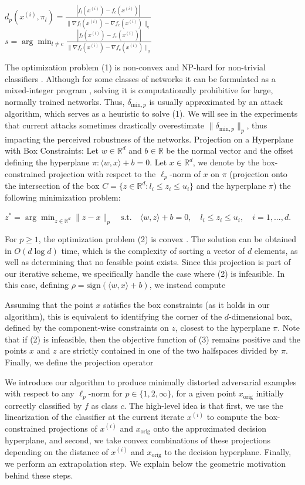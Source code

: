 $d_p(x^{(i)}, \pi_l) = \frac{|f_l(x^{(i)}) - f_c(x^{(i)})|}{\|\nabla f_l(x^{(i)}) - \nabla f_c(x^{(i)})\|_q}$
$s = \arg \min_{l \neq c} \frac{|f_l(x^{(i)}) - f_c(x^{(i)})|}{\|\nabla f_l(x^{(i)}) - \nabla f_c(x^{(i)})\|_q}$

The optimization problem (1) is non-convex and NP-hard for non-trivial classifiers \cite{katz2017reluplex}. Although for some classes of networks it can be formulated as a mixed-integer program \cite{tjeng2019evaluating}, solving it is computationally prohibitive for large, normally trained networks. Thus, $\delta_{\text{min},p}$ is usually approximated by an attack algorithm, which serves as a heuristic to solve (1). We will see in the experiments that current attacks sometimes drastically overestimate $\|\delta_{\text{min},p}\|_p$, thus impacting the perceived robustness of the networks.
Projection on a Hyperplane with Box Constraints: Let $w \in \mathbb{R}^d$ and $b \in \mathbb{R}$ be the normal vector and the offset defining the hyperplane $\pi : \langle w, x \rangle + b = 0$. Let $x \in \mathbb{R}^d$, we denote by the box-constrained projection with respect to the $\ell_p$-norm of $x$ on $\pi$ (projection onto the intersection of the box $C = \{ z \in \mathbb{R}^d : l_i \leq z_i \leq u_i \}$ and the hyperplane $\pi$) the following minimization problem:

$z^* = \arg \min_{z \in \mathbb{R}^d} \|z - x\|_p \quad \text{s.t.} \quad \langle w, z \rangle + b = 0, \quad l_i \leq z_i \leq u_i, \quad i = 1, ..., d.$

For $p \geq 1$, the optimization problem (2) is convex \cite{hein2017formal}. The solution can be obtained in $O(d \log d)$ time, which is the complexity of sorting a vector of $d$ elements, as well as determining that no feasible point exists. Since this projection is part of our iterative scheme, we specifically handle the case where (2) is infeasible. In this case, defining $\rho = \text{sign}(\langle w, x \rangle + b)$, we instead compute

Assuming that the point $x$ satisfies the box constraints (as it holds in our algorithm), this is equivalent to identifying the corner of the $d$-dimensional box, defined by the component-wise constraints on $z$, closest to the hyperplane $\pi$. Note that if (2) is infeasible, then the objective function of (3) remains positive and the points $x$ and $z$ are strictly contained in one of the two halfspaces divided by $\pi$. Finally, we define the projection operator

We introduce our algorithm to produce minimally distorted adversarial examples with respect to any $\ell_p$-norm for $p \in \{1, 2, \infty\}$, for a given point $x_{\text{orig}}$ initially correctly classified by $f$ as class $c$. The high-level idea is that first, we use the linearization of the classifier at the current iterate $x^{(i)}$ to compute the box-constrained projections of $x^{(i)}$ and $x_{\text{orig}}$ onto the approximated decision hyperplane, and second, we take convex combinations of these projections depending on the distance of $x^{(i)}$ and $x_{\text{orig}}$ to the decision hyperplane. Finally, we perform an extrapolation step. We explain below the geometric motivation behind these steps.

